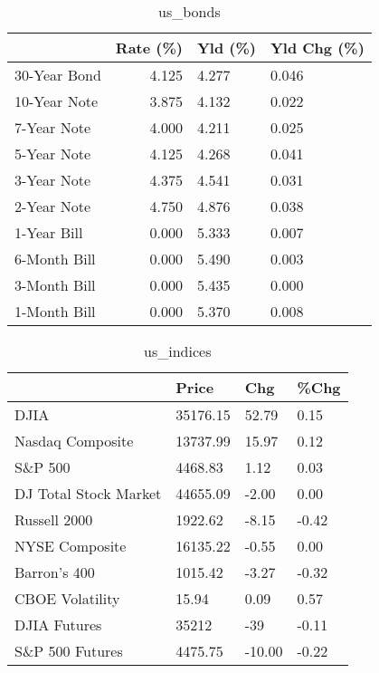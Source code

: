 \documentclass{article}%
\begin{document}
\begin{table}[htbp]%
\caption{us\_bonds}%
\centering%
\begin{adjustbox}{width=1\textwidth}%
\begin{tabular}{lrll}
\toprule
             &  Rate (\%) & Yld (\%) & Yld Chg (\%) \\
\midrule
30-Year Bond &     4.125 &   4.277 &       0.046 \\
10-Year Note &     3.875 &   4.132 &       0.022 \\
 7-Year Note &     4.000 &   4.211 &       0.025 \\
 5-Year Note &     4.125 &   4.268 &       0.041 \\
 3-Year Note &     4.375 &   4.541 &       0.031 \\
 2-Year Note &     4.750 &   4.876 &       0.038 \\
 1-Year Bill &     0.000 &   5.333 &       0.007 \\
6-Month Bill &     0.000 &   5.490 &       0.003 \\
3-Month Bill &     0.000 &   5.435 &       0.000 \\
1-Month Bill &     0.000 &   5.370 &       0.008 \\
\bottomrule
\end{tabular}
%
\end{adjustbox}%
\end{table}

%


\begin{table}[htbp]%
\caption{us\_indices}%
\centering%
\begin{adjustbox}{width=1\textwidth}%
\begin{tabular}{llll}
\toprule
                      &    Price &    Chg &  \%Chg \\
\midrule
                 DJIA & 35176.15 &  52.79 &  0.15 \\
     Nasdaq Composite & 13737.99 &  15.97 &  0.12 \\
              S\&P 500 &  4468.83 &   1.12 &  0.03 \\
DJ Total Stock Market & 44655.09 &  -2.00 &  0.00 \\
         Russell 2000 &  1922.62 &  -8.15 & -0.42 \\
       NYSE Composite & 16135.22 &  -0.55 &  0.00 \\
         Barron's 400 &  1015.42 &  -3.27 & -0.32 \\
      CBOE Volatility &    15.94 &   0.09 &  0.57 \\
         DJIA Futures &    35212 &    -39 & -0.11 \\
      S\&P 500 Futures &  4475.75 & -10.00 & -0.22 \\
\bottomrule
\end{tabular}
%
\end{adjustbox}%
\end{table}
\end{document}

